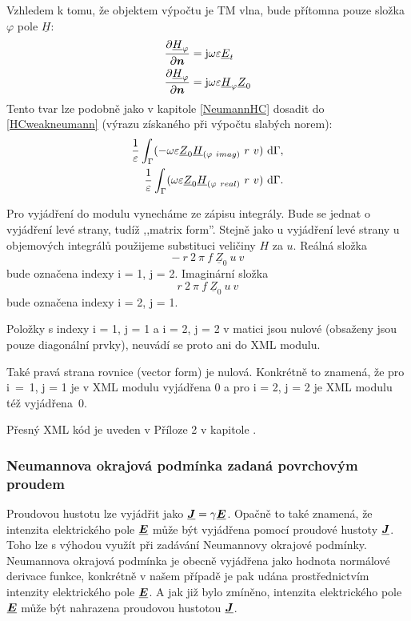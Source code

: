 \documentclass[12pt,a4paper,oneside]{article}
\numberwithin{equation}{section} %
\numberwithin{figure}{section} %
\numberwithin{table}{section} %
\newcommand{\mj}{\mathrm{j}} %
\renewcommand{\vec}[1]{\mbox{\boldmath$#1$}} %
\newcommand{\faz}[1]{{\underline{#1}}} %
\begin{document}
Vzhledem k tomu, že objektem výpočtu je TM vlna, bude přítomna pouze složka $\varphi$ pole $\faz{H}$:
\begin{subequations}
\begin{align}
\frac{\partial \faz{H} _{\varphi}}{\partial \vec{n}} &= \mj \omega \varepsilon \faz{E} _t
\\
\frac{\partial \faz{H} _{\varphi}}{\partial \vec{n}} &= \mj \omega \varepsilon \faz{H} _{\varphi}\faz{Z} _0
\end{align}
\end{subequations}
Tento tvar lze podobně jako v kapitole \ref{NeumannHC} dosadit do \ref{HCweakneumann} (výrazu získaného při výpočtu slabých norem):
\begin{subequations}
\begin{align}
\frac{1}{\varepsilon} \int _{\Gamma} ( - \omega \varepsilon \faz{Z} _0 \faz{H} _{(\varphi ~ imag)} ~ r ~ v ) ~ \ud \Gamma ,
\\ 
\frac{1}{\varepsilon} \int _{\Gamma} ( \omega \varepsilon \faz{Z} _0\faz{H} _{(\varphi ~ real)} ~ r ~ v ) ~ \ud \Gamma .
\end{align}
\end{subequations}

Pro vyjádření do modulu vynecháme ze zápisu integrály. Bude se jednat o vyjádření levé strany, tudíž ,,matrix form''. Stejně jako u vyjádření levé strany u objemových integrálů použijeme substituci veličiny $H$ za $u$. Reálná složka 
\begin{equation}
- ~ r ~ 2 ~ \pi ~ f ~ \faz{Z} _0 ~ u ~ v
\end{equation} 
bude označena indexy i = 1, j = 2. Imaginární složka 
\begin{equation}
r ~ 2 ~ \pi ~ f ~ \faz{Z} _0 ~ u ~ v
\end{equation}
bude označena indexy i = 2, j = 1.

Položky s indexy i = 1, j = 1 a i = 2, j = 2 v matici jsou nulové (obsaženy jsou pouze diagonální prvky), neuvádí se proto ani do XML modulu.

Také pravá strana rovnice (vector form) je nulová. Konkrétně to znamená, že pro i~=~1, j = 1 je v XML modulu vyjádřena $0$ a pro i = 2, j = 2 je XML modulu též vyjádřena~$0$.

Přesný XML kód je uveden v Příloze 2 v kapitole .



\subsubsection{Neumannova okrajová podmínka zadaná povrchovým proudem}
Proudovou hustotu lze vyjádřit jako $\faz{\vec{J}} = \gamma \faz{\vec{E}}$. Opačně to také znamená, že intenzita elektrického pole $\faz{\vec{E}}$ může být vyjádřena pomocí proudové hustoty $\faz{\vec{J}}$. Toho lze s výhodou využít při zadávání Neumannovy okrajové podmínky. Neumannova okrajová podmínka je obecně vyjádřena jako hodnota normálové derivace funkce, konkrétně v našem případě je pak udána prostřednictvím intenzity elektrického pole $\faz{\vec{E}}$. A jak již bylo zmíněno, intenzita elektrického pole $\faz{\vec{E}}$ může být nahrazena proudovou hustotou $\faz{\vec{J}}$.
\end{document}
